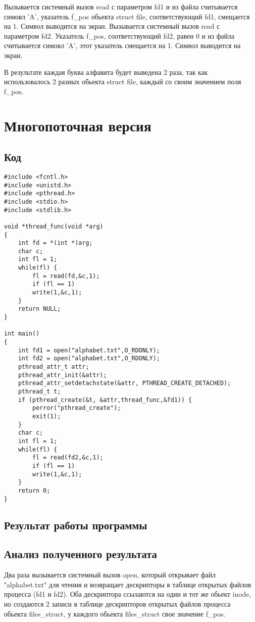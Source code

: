 Вызывается системный вызов read с параметром fd1 и из файла считывается симовл 'A', указатель f\_pos обьекта struct file, соответствующий fd1, смещается на 1. Символ выводится на экран. Вызывается системный вызов read с параметром fd2. Указатель f\_pos, соответствующий fd2, равен 0 и из файла считывается симовл 'A', этот указатель смещается на 1. Символ выводится на экран.

В результате каждая буква алфавита будет выведена 2 раза, так как использовалось 2 разных обьекта struct file, каждый со своим значением поля f\_pos.

\section{Многопоточная версия}
\subsection{Код}
\begin{lstlisting}[caption={Программа 2, вариант 1, многопоточная версия}, label=lst:p22]
#include <fcntl.h>
#include <unistd.h>
#include <pthread.h>
#include <stdio.h>
#include <stdlib.h>

void *thread_func(void *arg)
{
	int fd = *(int *)arg;
	char c;
	int fl = 1;
	while(fl) {
		fl = read(fd,&c,1);
		if (fl == 1) 
		write(1,&c,1);
	}
	return NULL;
}

int main()
{
	int fd1 = open("alphabet.txt",O_RDONLY);
	int fd2 = open("alphabet.txt",O_RDONLY);
	pthread_attr_t attr;
	pthread_attr_init(&attr);
	pthread_attr_setdetachstate(&attr, PTHREAD_CREATE_DETACHED);
	pthread_t t;
	if (pthread_create(&t, &attr,thread_func,&fd1)) {
		perror("pthread_create");
		exit(1);
	}
	char c;
	int fl = 1;
	while(fl) {
		fl = read(fd2,&c,1);
		if (fl == 1) 
		write(1,&c,1);
	}
	return 0;
}
\end{lstlisting}

\subsection{Результат работы программы}
\FloatBarrier
{}
\FloatBarrier

\subsection{Анализ полученного результата}
Два раза вызывается системный вызов open, который открывает файл "alphabet.txt" для чтения и возвращает дескрипторы в таблице открытых файлов процесса (fd1 и fd2). Оба дескриптора ссылаются на один и тот же обьект inode, но создаются 2 записи в таблице дескрипторов открытых файлов процесса обьекта files\_struct, у каждого обьекта files\_struct свое значение f\_pos.

